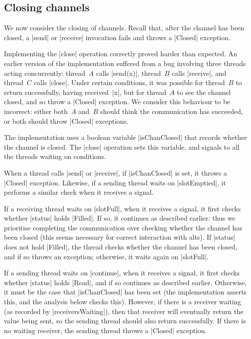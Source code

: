 \subsection{Closing channels}

\inlineScala

We now consider the closing of channels.  Recall that, after the channel has
been closed, a |send| or |receive| invocation fails and throws a |Closed|
exception.

Implementing the |close| operation correctly proved harder than expected.  An
earlier version of the implementation suffered from a bug involving three
threads acting concurrently: thread~$A$ calls |send(x)|, thread~$B$ calls
|receive|, and thread~$C$ calls |close|.  Under certain conditions, it was
possible for thread~$B$ to return successfully, having received~|x|, but for
thread~$A$ to see the channel closed, and so throw a |Closed| exception.  We
consider this behaviour to be incorrect: either both~$A$ and~$B$ should think
the communication has succeeded, or both should throw |Closed| exceptions.


The implementation uses a boolean variable |isChanClosed| that records whether
the channel is closed.  The |close| operation sets this variable, and signals
to all the threads waiting on conditions.

When a thread calls |send| or |receive|, if |isChanClosed| is set, it throws a
|Closed| exception.  Likewise, if a sending thread waits on |slotEmptied|, it
performs a similar check when it receives a signal.  

If a receiving thread waits on |slotFull|, when it receives a signal, it first
checks whether |status| holds |Filled|.  If so, it continues as described
earlier: thus we prioritise completing the communication over checking whether
the channel has been closed (this seems necessary for correct interaction with
alts).
If |status| does not hold |Filled|, the thread checks whether the channel has
been closed, and if so throws an exception; otherwise, it waits again on
|slotFull|.

If a sending thread waits on |continue|, when it receives a signal, it 
first checks whether |status| holds |Read|, and if so continues as described
earlier.  Otherwise, it must be the case that |isChanClosed| has been set (the
implementation asserts this, and the analysis below checks this).  However, if
there is a receiver waiting (as recorded by |receiversWaiting|), then that
receiver will eventually return the value being sent, so the sending thread
should also return successfully.  If there is no waiting receiver, the sending
thread throws a |Closed| exception.  

